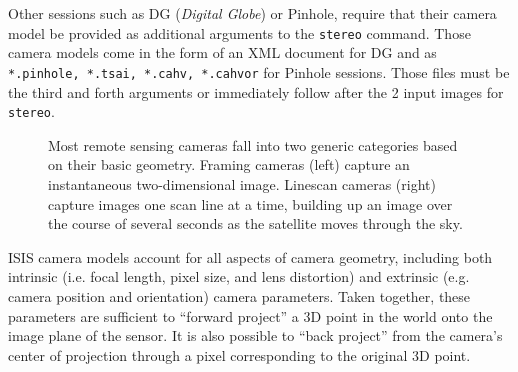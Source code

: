 Other sessions such as DG (\textit{Digital Globe}) or Pinhole, require that
their camera model be provided as additional arguments to the
\texttt{stereo} command. Those camera models come in the form of an
XML document for DG and as \texttt{*.pinhole, *.tsai, *.cahv,
  *.cahvor} for Pinhole sessions. Those files must be the third and
forth arguments or immediately follow after the 2 input images for
\texttt{stereo}.

\begin{figure}[h]
\centering
\caption{Most remote sensing cameras fall into two generic categories
  based on their basic geometry.  Framing cameras (left) capture an
  instantaneous two-dimensional image.  Linescan cameras (right)
  capture images one scan line at a time, building up an image over
  the course of several seconds as the satellite moves through the
  sky.}
\label{fig:camera_models}
\end{figure}

\ac{ISIS} camera models account for all aspects of camera geometry,
including both intrinsic (i.e. focal length, pixel size, and lens
distortion) and extrinsic (e.g. camera position and orientation)
camera parameters.  Taken together, these parameters are sufficient to
``forward project'' a 3D point in the world onto the image plane of
the sensor.  It is also possible to ``back project'' from the camera's
center of projection through a pixel corresponding to the original 3D
point.

